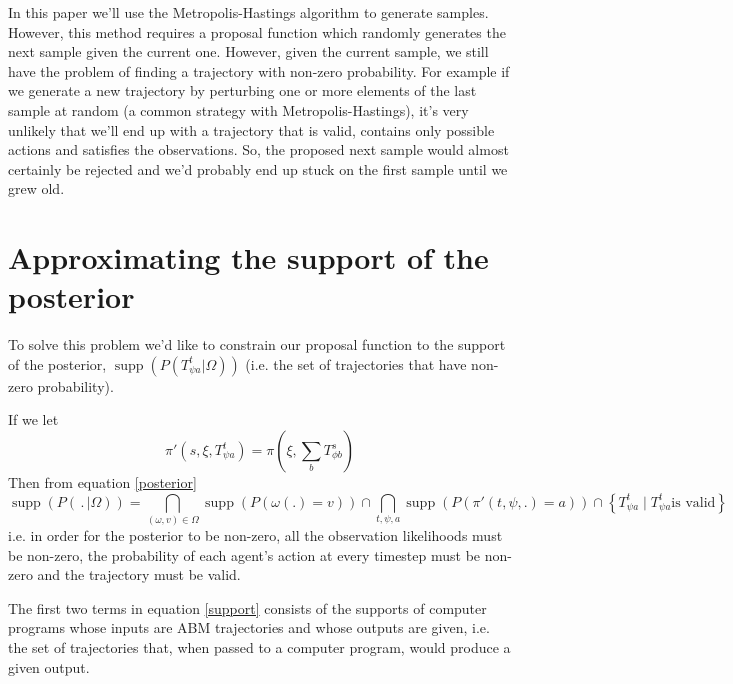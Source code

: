 \documentclass{article}
\DeclareMathOperator\supp{supp}
\begin{document}
In this paper we'll use the Metropolis-Hastings algorithm to generate samples. However, this method requires a proposal function which randomly generates the next sample given the current one. However, given the current sample, we still have the problem of finding a trajectory with non-zero probability. For example if we generate a new trajectory by perturbing one or more elements of the last sample at random (a common strategy with Metropolis-Hastings), it's very unlikely that we'll end up with a trajectory that is valid, contains only possible actions and satisfies the observations. So, the proposed next sample would almost certainly be rejected and we'd probably end up stuck on the first sample until we grew old.

\section{Approximating the support of the posterior}


To solve this problem we'd like to constrain our proposal function to the support of the posterior, $\supp(P(T^t_{\psi a}|\Omega))$ (i.e. the set of trajectories that have non-zero probability).

If we let
\[
\pi'(s, \xi, T^t_{\psi a}) = \pi(\xi,\sum_bT^{s}_{\phi b})
\]
Then from equation \ref{posterior}
\begin{equation}
\supp (P( \,.\, |\Omega)) = 
\bigcap_{(\omega,v) \in \Omega}  \supp\left(P\left(\omega(.)=v\right)\right) \cap
\bigcap_{t, \psi, a} \supp\left(P\left( \pi'(t,\psi,.) = a \right)\right) \cap
\left\{T^t_{\psi a} \mid T^t_{\psi a} \text{is valid}\right\}
\label{support}
\end{equation}
i.e. in order for the posterior to be non-zero, all the observation likelihoods must be non-zero, the probability of each agent's action at every timestep must be non-zero and the trajectory must be valid.

The first two terms in equation \ref{support} consists of the supports of computer programs whose inputs are ABM trajectories and whose outputs are given, i.e. the set of trajectories that, when passed to a computer program, would produce a given output.
\end{document}
